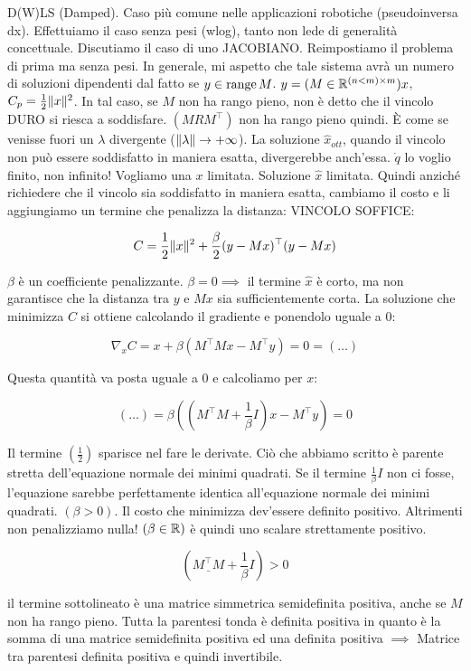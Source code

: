 D(W)LS (Damped). Caso più comune nelle applicazioni robotiche (pseudoinversa dx). Effettuiamo il caso senza pesi (wlog), tanto non lede di generalità concettuale. Discutiamo il caso di uno JACOBIANO. Reimpostiamo il problema di prima ma senza pesi. In generale, mi aspetto che tale sistema avrà un numero di soluzioni dipendenti dal fatto se $y\in\operatorname{range}{M}$. $y=(M\in\mathbb{R}^{(n<m)\times m})x$, $C_p = \frac{1}{2}\lVert x\rVert^2$. In tal caso, se $M$ non ha rango pieno, non è detto che il vincolo DURO si riesca a soddisfare. $(MRM^\top)$ non ha rango pieno quindi. \`E come se venisse fuori un $\lambda$ divergente ($\lVert\lambda\rVert\to+\infty$). La soluzione $\hat{x}_{ott}$, quando il vincolo non può essere soddisfatto in maniera esatta, divergerebbe anch'essa. $\dot{q}$ lo voglio finito, non infinito! Vogliamo una $x$ limitata. Soluzione $\hat{x}$ limitata. Quindi anziché richiedere che il vincolo sia soddisfatto in maniera esatta, cambiamo il costo e li aggiungiamo un termine che penalizza la distanza: VINCOLO SOFFICE:

\[	
	C = \frac{1}{2}\lVert x\rVert^2 + \frac{\beta}{2}(y-Mx)^\top(y-Mx)
\]

$\beta$ è un coefficiente penalizzante. $\beta=0\implies$ il termine $\hat{x}$ è corto, ma non garantisce che la distanza tra $y$ e $Mx$ sia sufficientemente corta. La soluzione che minimizza $C$ si ottiene calcolando il gradiente e ponendolo uguale a 0:

\[
	\nabla_x{C} = x + \beta(M^\top Mx-M^\top y) = 0 = (\dots)
\]

Questa quantità va posta uguale a 0 e calcoliamo per $x$:

\[
	(\dots) = \beta((M^\top M + \frac{1}{\beta}I)x-M^\top y) = 0
\]

Il termine $(\frac{1}{2})$ sparisce nel fare le derivate. Ciò che abbiamo scritto è parente stretta dell'equazione normale dei minimi quadrati. Se il termine $\frac{1}{\beta}I$ non ci fosse, l'equazione sarebbe perfettamente identica all'equazione normale dei minimi quadrati. $(\beta>0)$. Il costo che minimizza dev'essere definito positivo. Altrimenti non penalizziamo nulla! $(\beta\in\mathbb{R})$ è quindi uno scalare strettamente positivo.

\[
	(\underline{M^\top M} + \frac{1}{\beta}I)>0
\]

il termine sottolineato è una matrice simmetrica semidefinita positiva, anche se $M$ non ha rango pieno. Tutta la parentesi tonda è definita positiva in quanto è la somma di una matrice semidefinita positiva ed una definita positiva $\implies$ Matrice tra parentesi definita positiva e quindi invertibile. 


